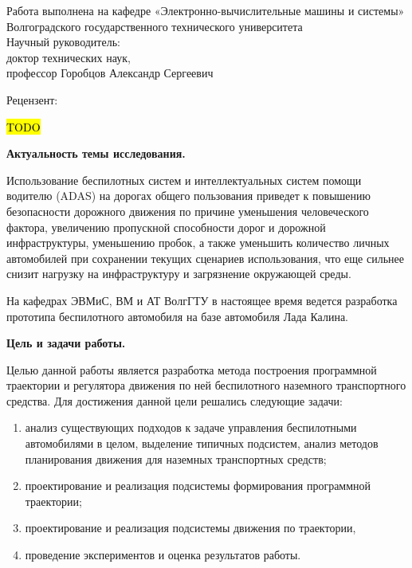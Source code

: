\begin{nospasing}
\noindent
Работа выполнена на кафедре «Электронно-вычислительные машины и
системы» Волгоградского государственного технического университета\\

\noindent
Научный руководитель:\\

    \setlength{\leftskip}{3cm}
    \noindent
    доктор технических наук, \\
    профессор Горобцов Александр Сергеевич \\

    \setlength{\leftskip}{0pt}

\noindent
Рецензент:

    \setlength{\leftskip}{3cm}
    \noindent
    \hl{TODO} \\

    \setlength{\leftskip}{0pt}

\end{nospasing}

\newpage
  

\textbf{Актуальность темы исследования.}

Использование беспилотных систем и интеллектуальных систем помощи водителю (ADAS) на дорогах общего
пользования приведет к повышению безопасности дорожного движения по причине уменьшения человеческого
фактора, увеличению пропускной способности дорог и дорожной инфраструктуры, уменьшению пробок, а также
уменьшить количество личных автомобилей при сохранении текущих сценариев использования, что еще
сильнее снизит нагрузку на инфраструктуру и загрязнение окружающей среды.

На кафедрах ЭВМиС, ВМ и АТ ВолгГТУ в настоящее время ведется разработка прототипа беспилотного
автомобиля на базе автомобиля Лада Калина.

\textbf{Цель и задачи работы.}

Целью данной работы является разработка метода построения программной траектории и регулятора движения по ней
беспилотного наземного транспортного средства.
Для достижения данной цели решались следующие задачи:
\begin{enumerate}
    \item анализ существующих подходов к задаче управления беспилотными автомобилями в целом, выделение
          типичных подсистем, анализ методов планирования движения для наземных транспортных средств;
    \item проектирование и реализация подсистемы формирования программной траектории;
    \item проектирование и реализация подсистемы движения по траектории,
    \item проведение экспериментов и оценка результатов работы.
\end{enumerate}

